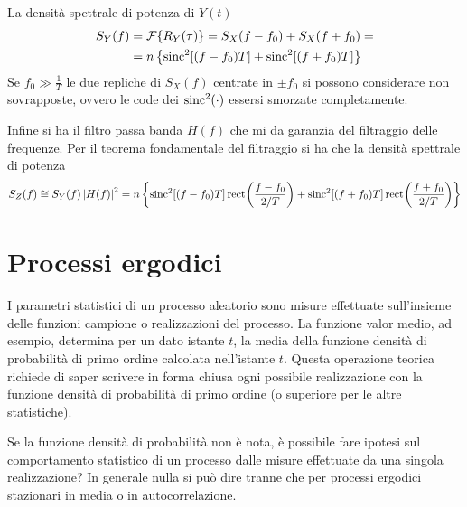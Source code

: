 La densità spettrale di potenza di $Y(t)$
\[\begin{split}S_Y(f)&=\operatorname{\mathcal{F}}\!\left\lbrace{R_Y(\tau)}\right\rbrace=S_X(f-f_0)+S_X(f+f_0)=\\&=n\left\lbrace\operatorname{sinc}^2[(f-f_0)T]+\operatorname{sinc}^2[(f+f_0)T]\right\rbrace\end{split}\]
Se $f_0\gg\frac{1}{T}$ le due repliche di $S_X(f)$ centrate in $\pm f_0$ si possono considerare non sovrapposte, ovvero le code dei $\operatorname{sinc}^2(\cdot)$ essersi smorzate completamente.

Infine si ha il filtro passa banda $H(f)$ che mi da garanzia del filtraggio delle frequenze. Per il teorema fondamentale del filtraggio si ha che la densità spettrale di potenza
\[S_Z(f)\cong S_Y(f)\left|{H(f)}\right|^2=n\left\lbrace\operatorname{sinc}^2[(f-f_0)T]\,{\operatorname{rect}}^{}\!\left({\frac{f-f_0}{2/T}}\right)+\operatorname{sinc}^2[(f+f_0)T]\,{\operatorname{rect}}^{}\!\left({\frac{f+f_0}{2/T}}\right)\right\rbrace\]

\begin{figure}[h!]
	\centering{}
\end{figure}

\section{Processi ergodici}
I parametri statistici di un processo aleatorio sono misure effettuate sull'insieme delle funzioni campione o realizzazioni del processo. La funzione valor medio, ad esempio, determina per un dato istante $t$, la media della funzione densità di probabilità di primo ordine calcolata nell'istante $t$. Questa operazione teorica richiede di saper scrivere in forma chiusa ogni possibile realizzazione con la funzione densità di probabilità di primo ordine (o superiore per le altre statistiche).

Se la funzione densità di probabilità non è nota, è possibile fare ipotesi sul comportamento statistico di un processo dalle misure effettuate da una singola realizzazione?
In generale nulla si può dire tranne che per processi ergodici stazionari in media o in autocorrelazione.

